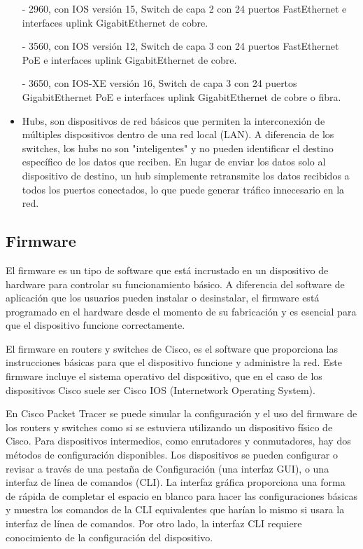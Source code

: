 \documentclass{article}
\begin{document}
\begin{itemize}
    - 2960, con IOS versión 15, Switch de capa 2 con 24 puertos FastEthernet e interfaces uplink GigabitEthernet de cobre.

    - 3560, con IOS versión 12, Switch de capa 3 con 24 puertos FastEthernet PoE e interfaces uplink GigabitEthernet de cobre.

    - 3650, con IOS-XE versión 16, Switch de capa 3 con 24 puertos GigabitEthernet PoE e interfaces uplink GigabitEthernet de cobre o fibra.

    \item Hubs, son dispositivos de red básicos que permiten la interconexión de múltiples dispositivos dentro de una red local (LAN). A diferencia de los switches, los hubs no son "inteligentes" y no pueden identificar el destino específico de los datos que reciben. En lugar de enviar los datos solo al dispositivo de destino, un hub simplemente retransmite los datos recibidos a todos los puertos conectados, lo que puede generar tráfico innecesario en la red.
\end{itemize}

\subsection{Firmware}
El firmware es un tipo de software que está incrustado en un dispositivo de hardware para controlar su funcionamiento básico. A diferencia del software de aplicación que los usuarios pueden instalar o desinstalar, el firmware está programado en el hardware desde el momento de su fabricación y es esencial para que el dispositivo funcione correctamente.

El firmware en routers y switches de Cisco, es el software que proporciona las instrucciones básicas para que el dispositivo funcione y administre la red. Este firmware incluye el sistema operativo del dispositivo, que en el caso de los dispositivos Cisco suele ser Cisco IOS (Internetwork Operating System).

En Cisco Packet Tracer se puede simular la configuración y el uso del firmware de los routers y switches como si se estuviera utilizando un dispositivo físico de Cisco. Para dispositivos intermedios, como enrutadores y conmutadores, hay dos métodos de configuración disponibles. Los dispositivos se pueden configurar o revisar a través de una pestaña de Configuración (una interfaz GUI), o una interfaz de línea de comandos (CLI). La interfaz gráfica proporciona una forma de rápida de completar el espacio en blanco para hacer las configuraciones básicas y muestra los comandos de la CLI equivalentes que harían lo mismo si usara la interfaz de línea de comandos. Por otro lado, la interfaz CLI requiere conocimiento de la configuración del dispositivo.
\end{document}
